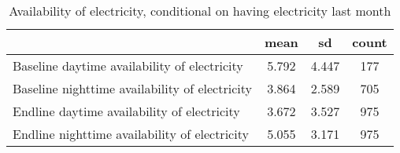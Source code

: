 \begin{table}[htbp]\centering
\def\sym#1{\ifmmode^{#1}\else\(^{#1}\)\fi}
\caption{Availability of electricity, conditional on having electricity last month}
\begin{tabular*}{0.9\hsize}{@{\hskip\tabcolsep\extracolsep\fill}l*{1}{ccc}}
\toprule
                                &     mean&       sd&    count\\
\midrule
Baseline daytime availability of electricity&    5.792&    4.447&      177\\
Baseline nighttime availability of electricity&    3.864&    2.589&      705\\
Endline daytime availability of electricity&    3.672&    3.527&      975\\
Endline nighttime availability of electricity&    5.055&    3.171&      975\\
\bottomrule
\end{tabular*}
\end{table}

